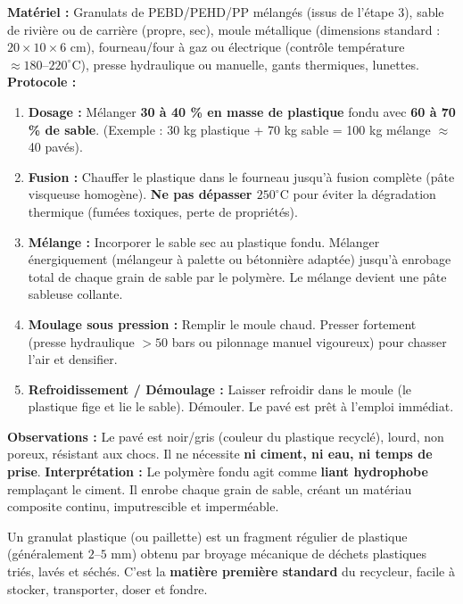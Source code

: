 \documentclass[11pt]{article}
\newcommand{\cle}[1]{{\popxbold\color{popdark}#1}}
\begin{document}
\begin{experience}
\textbf{Matériel :} Granulats de PEBD/PEHD/PP mélangés (issus de l'étape 3), sable de rivière ou de carrière (propre, sec), moule métallique (dimensions standard : $20 \times 10 \times 6$ cm), fourneau/four à gaz ou électrique (contrôle température $\approx 180\text{--}220^\circ\text{C}$), presse hydraulique ou manuelle, gants thermiques, lunettes.
\textbf{Protocole :}
\begin{enumerate}
    \item \textbf{Dosage :} Mélanger \textbf{30 à 40 \% en masse de plastique} fondu avec \textbf{60 à 70 \% de sable}. (Exemple : 30 kg plastique + 70 kg sable = 100 kg mélange $\approx$ 40 pavés).
    \item \textbf{Fusion :} Chauffer le plastique dans le fourneau jusqu'à fusion complète (pâte visqueuse homogène). \textbf{Ne pas dépasser $250^\circ\text{C}$} pour éviter la dégradation thermique (fumées toxiques, perte de propriétés).
    \item \textbf{Mélange :} Incorporer le sable sec au plastique fondu. Mélanger énergiquement (mélangeur à palette ou bétonnière adaptée) jusqu'à enrobage total de chaque grain de sable par le polymère. Le mélange devient une pâte sableuse collante.
    \item \textbf{Moulage sous pression :} Remplir le moule chaud. Presser fortement (presse hydraulique $> 50$ bars ou pilonnage manuel vigoureux) pour chasser l'air et densifier.
    \item \textbf{Refroidissement / Démoulage :} Laisser refroidir dans le moule (le plastique fige et lie le sable). Démouler. Le pavé est prêt à l'emploi immédiat.
\end{enumerate}
\textbf{Observations :} Le pavé est noir/gris (couleur du plastique recyclé), lourd, non poreux, résistant aux chocs. Il ne nécessite \textbf{ni ciment, ni eau, ni temps de prise}.
\textbf{Interprétation :} Le polymère fondu agit comme \textbf{liant hydrophobe} remplaçant le ciment. Il enrobe chaque grain de sable, créant un matériau composite continu, imputrescible et imperméable.
\end{experience}

\begin{definition}
Un \cle{granulat plastique} (ou \cle{paillette}) est un fragment régulier de plastique (généralement $2\text{--}5$ mm) obtenu par broyage mécanique de déchets plastiques triés, lavés et séchés. C'est la \textbf{matière première standard} du recycleur, facile à stocker, transporter, doser et fondre.
\end{definition}
\end{document}
